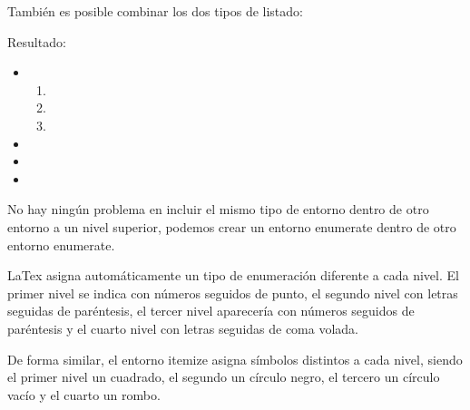 \documentclass[11pt, a4paper]{article}
\begin{document}

También es posible combinar los dos tipos de listado:


		 


			 

			 

			 


		 

		 

		 


Resultado:

	\begin{itemize}
		\item {}
		\begin{enumerate}
			\item {}
			\item {}
			\item {}
		\end{enumerate}
		\item {}
		\item {}
		\item {}
	\end{itemize}

No hay ningún problema en incluir el mismo tipo de entorno dentro de otro entorno a un nivel superior, podemos crear un entorno enumerate dentro de otro entorno enumerate.

LaTex asigna automáticamente un tipo de enumeración diferente a cada nivel. El primer nivel se indica con números seguidos de punto, el segundo nivel con letras seguidas de paréntesis, el tercer nivel aparecería con números seguidos de paréntesis y el cuarto nivel con letras seguidas de coma volada.

De forma similar, el entorno itemize asigna símbolos distintos a cada nivel, siendo el primer nivel un cuadrado, el segundo un círculo negro, el tercero un círculo vacío y el cuarto un rombo.
\end{document}
